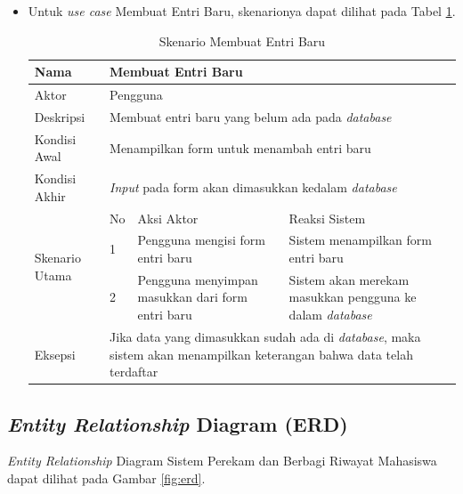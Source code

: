 \begin{itemize}
\item Untuk {\it use case} Membuat Entri Baru, skenarionya dapat dilihat pada Tabel
\ref{tab:skenarioentribaru}.

\begin{table}[ht]
\centering
\caption[Tabel Skenario Membuat Entri Baru]{Skenario Membuat Entri Baru}
\label{tab:skenarioentribaru}
\begin{tabular}{|p{1.4cm}|p{0.4cm}|p{2cm}|p{2cm}|p{2cm}|p{2cm}|}
\hline
Nama & \multicolumn{5}{p{8cm}|}{Membuat Entri Baru} \\ \hline
Aktor & \multicolumn{5}{p{8cm}|}{Pengguna} \\ \hline
Deskripsi & \multicolumn{5}{p{8cm}|}{Membuat entri baru yang belum ada pada
{\it database}} \\ \hline
Kondisi Awal & \multicolumn{5}{p{8cm}|}{Menampilkan form untuk menambah entri baru} \\ \hline
Kondisi Akhir & \multicolumn{5}{p{8cm}|}{{\it Input} pada form akan dimasukkan kedalam {\it database}} \\ \hline
\multirow{3}{*}{\parbox{1.4cm}{Skenario Utama}} & No &
\multicolumn{2}{p{4cm}|}{Aksi Aktor} & \multicolumn{2}{p{4cm}|}{Reaksi Sistem}
\\ \cline{2-6}
& 1 & \multicolumn{2}{p{4cm}|}{Pengguna mengisi form entri baru} &
\multicolumn{2}{p{4cm}|}{Sistem menampilkan form entri baru} \\ \cline{2-6}
& 2 & \multicolumn{2}{p{4cm}|}{Pengguna menyimpan masukkan dari form entri baru}
& \multicolumn{2}{p{4cm}|}{Sistem akan merekam masukkan pengguna ke dalam
{\it database}} \\ \hline
Eksepsi & \multicolumn{5}{p{8cm}|}{Jika data yang dimasukkan sudah ada di {\it database}, maka sistem akan menampilkan keterangan bahwa data telah terdaftar} \\ \hline
\end{tabular}
\end{table}
\end{itemize}

\subsection{{\it Entity Relationship} Diagram (ERD)}
{\it Entity Relationship} Diagram Sistem Perekam dan Berbagi Riwayat Mahasiswa dapat
dilihat pada Gambar \ref{fig:erd}.

